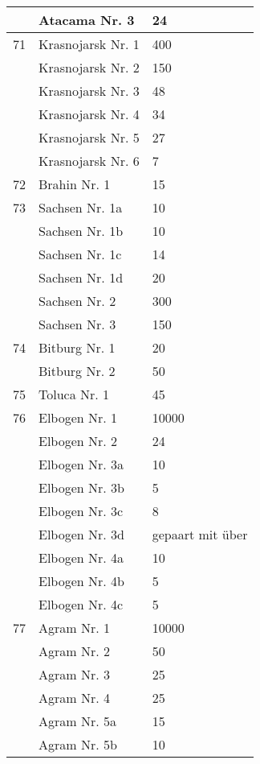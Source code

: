 \documentclass[a4paper, 11pt, oneside, polutonikogreek, german]{article}
\begin{document}
\begin{center}
\begin{longtable}{|l|l|l|}
          & Atacama Nr. 3 & 24 \\ \hline
        71 & Krasnojarsk Nr. 1 & 400 \\ \hline
          & Krasnojarsk Nr. 2 & 150 \\ \hline
          & Krasnojarsk Nr. 3 & 48 \\ \hline
          & Krasnojarsk Nr. 4 & 34 \\ \hline
          & Krasnojarsk Nr. 5 & 27 \\ \hline
          & Krasnojarsk Nr. 6 & 7 \\ \hline
        72 & Brahin Nr. 1 & 15 \\ \hline
        73 & Sachsen Nr. 1a & 10 \\ \hline
          & Sachsen Nr. 1b & 10 \\ \hline
          & Sachsen Nr. 1c & 14 \\ \hline
          & Sachsen Nr. 1d & 20 \\ \hline
          & Sachsen Nr. 2 & 300 \\ \hline
          & Sachsen Nr. 3 & 150 \\ \hline
        74 & Bitburg Nr. 1 & 20 \\ \hline
          & Bitburg Nr. 2 & 50 \\ \hline
        75 & Toluca Nr. 1 & 45 \\ \hline
        76 & Elbogen Nr. 1 & 10000 \\ \hline
          & Elbogen Nr. 2 & 24 \\ \hline
          & Elbogen Nr. 3a & 10 \\ \hline
          & Elbogen Nr. 3b & 5 \\ \hline
          & Elbogen Nr. 3c & 8 \\ \hline
          & Elbogen Nr. 3d & gepaart mit über \\ \hline
          & Elbogen Nr. 4a & 10 \\ \hline
          & Elbogen Nr. 4b & 5 \\ \hline
          & Elbogen Nr. 4c & 5 \\ \hline
        77 & Agram Nr. 1 & 10000 \\ \hline
          & Agram Nr. 2 & 50 \\ \hline
          & Agram Nr. 3 & 25 \\ \hline
          & Agram Nr. 4 & 25 \\ \hline
          & Agram Nr. 5a & 15 \\ \hline
          & Agram Nr. 5b & 10 \\ \hline

\end{longtable}
\end{center}
\end{document}
